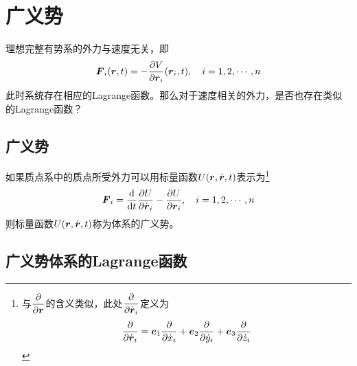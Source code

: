 \section{广义势}

理想完整有势系的外力与速度无关，即
\begin{equation*}
	\boldsymbol{F}_i(\boldsymbol{r},t) = -\frac{\partial V}{\partial \boldsymbol{r}_i}(\boldsymbol{r}_i,t),\quad i=1,2,\cdots,n
\end{equation*}
此时系统存在相应的Lagrange函数。那么对于速度相关的外力，是否也存在类似的Lagrange函数？

\subsection{广义势}

如果质点系中的质点所受外力可以用标量函数$U(\boldsymbol{r},\dot{\boldsymbol{r}},t)$表示为\footnote{与$\dfrac{\partial}{\partial \boldsymbol{r}}$的含义类似，此处$\dfrac{\partial}{\partial \dot{\boldsymbol{r}}_i}$定义为\begin{equation*} \frac{\partial}{\partial \dot{\boldsymbol{r}}_i} = \boldsymbol{e}_1 \frac{\partial}{\partial \dot{x}_i} + \boldsymbol{e}_2 \frac{\partial}{\partial \dot{y}_i} + \boldsymbol{e}_3 \frac{\partial}{\partial \dot{z}_i} \end{equation*}}
\begin{equation}
	\boldsymbol{F}_i = \frac{\mathrm{d}}{\mathrm{d} t} \frac{\partial U}{\partial \dot{\boldsymbol{r}}_i} - \frac{\partial U}{\partial \boldsymbol{r}_i},\quad i = 1,2,\cdots,n
	\label{广义势关系}
\end{equation}
则标量函数$U(\boldsymbol{r},\dot{\boldsymbol{r}},t)$称为体系的{\heiti 广义势}。

\subsection{广义势体系的Lagrange函数}

